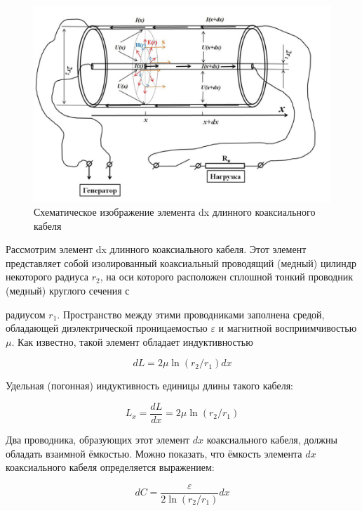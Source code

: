 \documentclass[a4paper,12 pt]{article}
\begin{document}
\begin{figure}
    \centering
    \includegraphics[scale = 0.7]{1.png}
    \caption{Схематическое изображение элемента dx длинного коаксиального кабеля}
    \label{fig:enter-label}
\end{figure}

Рассмотрим элемент dx длинного коаксиального кабеля. Этот элемент представляет
собой изолированный коаксиальный проводящий (медный) цилиндр некоторого радиуса $r_2$, на оси которого расположен сплошной тонкий проводник (медный) круглого сечения с 

радиусом $r_{1}$. Пространство между этими проводниками заполнена средой, обладающей диэлектрической проницаемостью $\varepsilon$ и магнитной восприимчивостью $\mu$. Как известно, такой элемент обладает индуктивностью


\begin{equation*}
d L=2 \mu \ln \left(r_{2} / r_{1}\right) d x \tag{1}
\end{equation*}


Удельная (погонная) индуктивность единицы длины такого кабеля:


\begin{equation*}
L_{x}=\frac{d L}{d x}=2 \mu \ln \left(r_{2} / r_{1}\right) \tag{2}
\end{equation*}


Два проводника, образующих этот элемент $d x$ коаксиального кабеля, должны обладать взаимной ёмкостью. Можно показать, что ёмкость элемента $d x$ коаксиального кабеля определяется выражением:


\begin{equation*}
d C=\frac{\varepsilon}{2 \ln \left(r_{2} / r_{1}\right)} d x \tag{3}
\end{equation*}
\end{document}
